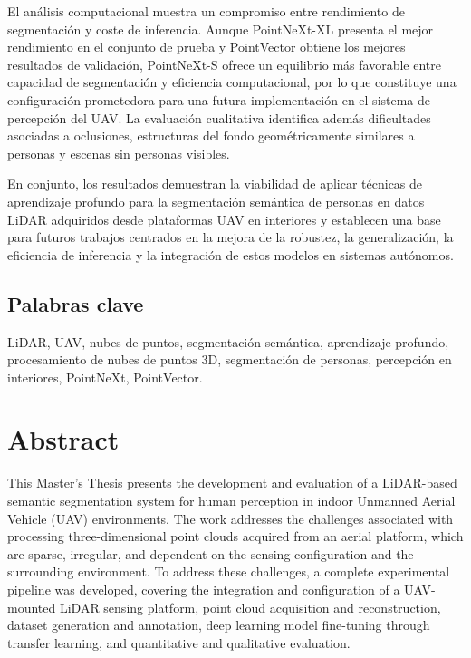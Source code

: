 El análisis computacional muestra un compromiso entre rendimiento de segmentación y coste de inferencia. Aunque PointNeXt-XL presenta el mejor rendimiento en el conjunto de prueba y PointVector obtiene los mejores resultados de validación, PointNeXt-S ofrece un equilibrio más favorable entre capacidad de segmentación y eficiencia computacional, por lo que constituye una configuración prometedora para una futura implementación en el sistema de percepción del UAV. La evaluación cualitativa identifica además dificultades asociadas a oclusiones, estructuras del fondo geométricamente similares a personas y escenas sin personas visibles.

En conjunto, los resultados demuestran la viabilidad de aplicar técnicas de aprendizaje profundo para la segmentación semántica de personas en datos LiDAR adquiridos desde plataformas UAV en interiores y establecen una base para futuros trabajos centrados en la mejora de la robustez, la generalización, la eficiencia de inferencia y la integración de estos modelos en sistemas autónomos.

\vfill
\section*{Palabras clave}
LiDAR, UAV, nubes de puntos, segmentación semántica, aprendizaje profundo, procesamiento de nubes de puntos 3D, segmentación de personas, percepción en interiores, PointNeXt, PointVector.
\newpage
\chapter*{Abstract}

This Master's Thesis presents the development and evaluation of a LiDAR-based semantic segmentation system for human perception in indoor Unmanned Aerial Vehicle (UAV) environments. The work addresses the challenges associated with processing three-dimensional point clouds acquired from an aerial platform, which are sparse, irregular, and dependent on the sensing configuration and the surrounding environment. To address these challenges, a complete experimental pipeline was developed, covering the integration and configuration of a UAV-mounted LiDAR sensing platform, point cloud acquisition and reconstruction, dataset generation and annotation, deep learning model fine-tuning through transfer learning, and quantitative and qualitative evaluation.


